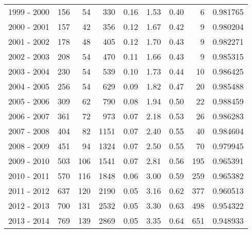 \begin{tabular}{lrrrrrrrl}
1999 - 2000 &                     156 &          54 &      330 &        0.16 &        1.53 &        0.40 &           6 &   0.981765 \\
2000 - 2001 &                     157 &          42 &      356 &        0.12 &        1.67 &        0.42 &           9 &   0.980204 \\
2001 - 2002 &                     178 &          48 &      405 &        0.12 &        1.70 &        0.43 &           9 &   0.982271 \\
2002 - 2003 &                     208 &          54 &      470 &        0.11 &        1.66 &        0.43 &           9 &   0.985315 \\
2003 - 2004 &                     230 &          54 &      539 &        0.10 &        1.73 &        0.44 &          10 &   0.986425 \\
2004 - 2005 &                     256 &          54 &      629 &        0.09 &        1.82 &        0.47 &          20 &   0.985488 \\
2005 - 2006 &                     309 &          62 &      790 &        0.08 &        1.94 &        0.50 &          22 &   0.988459 \\
2006 - 2007 &                     361 &          72 &      973 &        0.07 &        2.18 &        0.53 &          26 &   0.986283 \\
2007 - 2008 &                     404 &          82 &     1151 &        0.07 &        2.40 &        0.55 &          40 &   0.984604 \\
2008 - 2009 &                     451 &          94 &     1324 &        0.07 &        2.50 &        0.55 &          70 &   0.979945 \\
2009 - 2010 &                     503 &         106 &     1541 &        0.07 &        2.81 &        0.56 &         195 &   0.965391 \\
2010 - 2011 &                     570 &         116 &     1848 &        0.06 &        3.00 &        0.59 &         259 &   0.965382 \\
2011 - 2012 &                     637 &         120 &     2190 &        0.05 &        3.16 &        0.62 &         377 &   0.960513 \\
2012 - 2013 &                     700 &         131 &     2532 &        0.05 &        3.30 &        0.63 &         498 &   0.954322 \\
2013 - 2014 &                     769 &         139 &     2869 &        0.05 &        3.35 &        0.64 &         651 &   0.948933 \\

\end{tabular}
